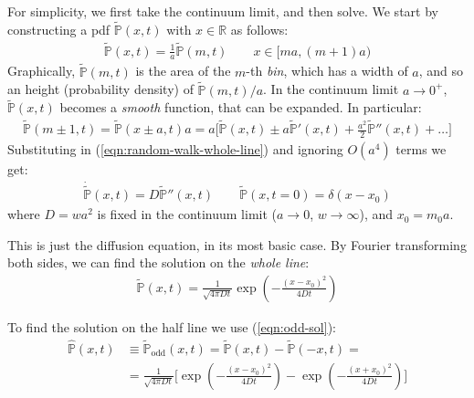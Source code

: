 \documentclass[../../main.tex]{subfiles}
\begin{document}
For simplicity, we first take the continuum limit, and then solve. We start by constructing a pdf $\tilde{\mathbb{P}}(x,t)$ with $x \in \mathbb{R}$ as follows:
\begin{align*}
    \tilde{\mathbb{P}}(x,t) = \frac{1}{a} \tilde{\mathbb{P}}(m,t) \qquad x \in [ma,(m+1)a)
\end{align*} 
Graphically, $\tilde{\mathbb{P}}(m,t)$ is the area of the $m$-th \textit{bin}, which has a width of $a$, and so an height (probability density) of $\tilde{\mathbb{P}}(m,t) / a$. In the continuum limit $a \to 0^+$, $\tilde{\mathbb{P}}(x,t)$ becomes a \textit{smooth} function, that can be expanded. In particular:
\begin{align*}
    \tilde{\mathbb{P}}(m\pm 1, t) = \tilde{\mathbb{P}}(x\pm a, t) a = a \Big[\tilde{\mathbb{P}}(x,t) \pm a \tilde{\mathbb{P}}'(x,t) + \frac{a^2}{2} \tilde{\mathbb{P}}''(x,t) + \dots \Big]
\end{align*} 
Substituting in (\ref{eqn:random-walk-whole-line}) and ignoring $O(a^4)$ terms we get:
\begin{align*}
    \dot{\tilde{\mathbb{P}}}(x,t) = D \tilde{\mathbb{P}}''(x,t) \qquad \tilde{\mathbb{P}}(x,t=0) = \delta(x-x_0)
\end{align*}
where $D = w a^2$ is fixed in the continuum limit ($a \to 0$, $w \to \infty$), and $x_0 = m_0 a$.

\medskip

This is just the diffusion equation, in its most basic case. By Fourier transforming both sides, we can find the solution on the \textit{whole line}:
\begin{align*}
    \tilde{\mathbb{P}}(x,t) = \frac{1}{\sqrt{4 \pi D t}} \exp\left(-\frac{(x-x_0)^2}{4 D t} \right)
\end{align*}

To find the solution on the half line we use (\ref{eqn:odd-sol}):
\begin{align*}
    \hat{\mathbb{P}}(x,t) &\equiv \tilde{\mathbb{P}}_{\mathrm{odd}}(x,t) = \tilde{\mathbb{P}}(x,t) - \tilde{\mathbb{P}}(-x,t) =\\
    &=  \frac{1}{\sqrt{4 \pi D t}} \Big[ \exp\left(-\frac{(x-x_0)^2}{4 D t} \right) - \exp\left(-\frac{(x+x_0)^2}{4 D t} \right) \Big]
\end{align*}
\end{document}
